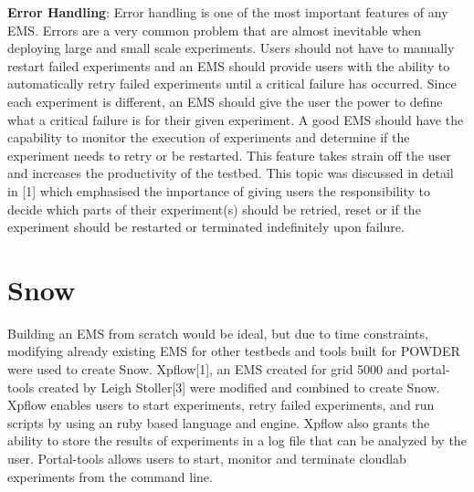 \documentclass[12pt, letterpaper]{article}
\begin{document}
\begin{multicols}{2}
\textbf{Error Handling}:
Error handling is one of the most important features of any EMS.  Errors are a very common problem that are almost inevitable when deploying large and small scale experiments.  Users should not have to manually restart failed experiments and an EMS should provide users with the ability to automatically retry failed experiments until a critical failure has occurred.  Since each experiment is different, an EMS should give the user the power to define what a critical failure is for their given experiment. A good EMS should have the capability to monitor the execution of experiments and determine if the experiment needs to retry or be restarted.  This feature takes strain off the user and increases the productivity of the testbed. This topic was discussed in detail in [1] which emphasised the importance of giving users the responsibility to decide which parts of their experiment(s) should be retried, reset or if the experiment should be restarted or terminated indefinitely upon failure. 
\section{Snow}
\quad Building an EMS from scratch would be ideal, but due to time constraints, modifying already existing EMS for other testbeds and tools built for POWDER were used to create  Snow.  Xpflow[1], an EMS created for grid 5000 and portal-tools created by Leigh Stoller[3] were modified and combined to create Snow.  Xpflow enables users to start experiments, retry failed experiments, and run scripts by using an ruby based language and engine.  Xpflow also grants the ability to store the results of experiments in a log file that can be analyzed by the user.  Portal-tools allows users to start, monitor and terminate cloudlab experiments from the command line.  

\end{multicols}
\end{document}

